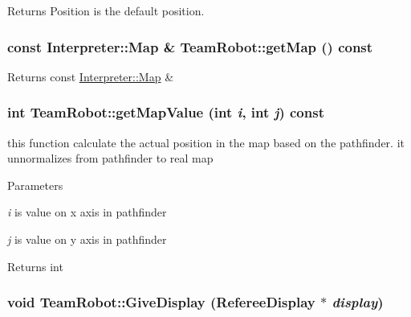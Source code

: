\begin{DoxyReturn}{Returns}
Position is the default position. 
\end{DoxyReturn}
\hypertarget{classTeamRobot_a8b5fa0d9f42166fc3339ec901fad5a91}{
\subsubsection[{getMap}]{\setlength{\rightskip}{0pt plus 5cm}const {\bf Interpreter::Map} \& TeamRobot::getMap () const}}
\label{classTeamRobot_a8b5fa0d9f42166fc3339ec901fad5a91}
\begin{DoxyReturn}{Returns}
const \hyperlink{classInterpreter_a4c080f069f557cf92dfe803117a6ea53}{Interpreter::Map} \& 
\end{DoxyReturn}
\hypertarget{classTeamRobot_abc3a5d2d4cac44629a9d8851164b5eda}{
\subsubsection[{getMapValue}]{\setlength{\rightskip}{0pt plus 5cm}int TeamRobot::getMapValue (int {\em i}, \/  int {\em j}) const}}
\label{classTeamRobot_abc3a5d2d4cac44629a9d8851164b5eda}


this function calculate the actual position in the map based on the pathfinder. it unnormalizes from pathfinder to real map 


\begin{DoxyParams}{Parameters}
\item[{\em i}]is value on x axis in pathfinder \item[{\em j}]is value on y axis in pathfinder \end{DoxyParams}
\begin{DoxyReturn}{Returns}
int 
\end{DoxyReturn}
\hypertarget{classTeamRobot_a2caa2411b9972fa5caa595f568394ba0}{
\subsubsection[{GiveDisplay}]{\setlength{\rightskip}{0pt plus 5cm}void TeamRobot::GiveDisplay ({\bf RefereeDisplay} $\ast$ {\em display})}}
\label{classTeamRobot_a2caa2411b9972fa5caa595f568394ba0}

